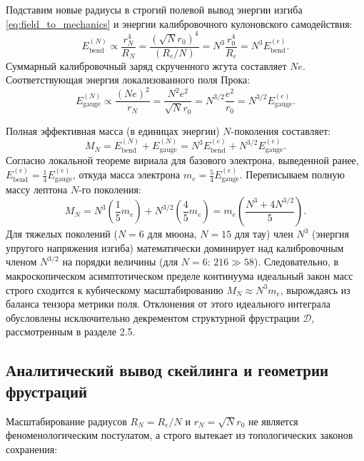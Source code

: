\documentclass[12pt,a4paper]{article}
\begin{document}
Подставим новые радиусы в строгий полевой вывод энергии изгиба \eqref{eq:field_to_mechanics} и энергии калибровочного кулоновского самодействия:
\begin{equation}
E_{\text{bend}}^{(N)} \propto \frac{r_N^4}{R_N} = \frac{(\sqrt{N} r_0)^4}{(R_e / N)} = N^3 \frac{r_0^4}{R_e} = N^3 E_{\text{bend}}^{(e)}.
\end{equation}
Суммарный калибровочный заряд скрученного жгута составляет $N e$. Соответствующая энергия локализованного поля Прока:
\begin{equation}
E_{\text{gauge}}^{(N)} \propto \frac{(Ne)^2}{r_N} = \frac{N^2 e^2}{\sqrt{N} r_0} = N^{3/2} \frac{e^2}{r_0} = N^{3/2} E_{\text{gauge}}^{(e)}.
\end{equation}

Полная эффективная масса (в единицах энергии) $N$-поколения составляет:
\begin{equation}
M_N = E_{\text{bend}}^{(N)} + E_{\text{gauge}}^{(N)} = N^3 E_{\text{bend}}^{(e)} + N^{3/2} E_{\text{gauge}}^{(e)}.
\end{equation}
Согласно локальной теореме вириала для базового электрона, выведенной ранее, $E_{\text{bend}}^{(e)} = \frac{1}{4} E_{\text{gauge}}^{(e)}$, откуда масса электрона $m_e = \frac{5}{4} E_{\text{gauge}}^{(e)}$. 
Переписываем полную массу лептона $N$-го поколения:
\begin{equation}
M_N = N^3 \left( \frac{1}{5} m_e \right) + N^{3/2} \left( \frac{4}{5} m_e \right) = m_e \left( \frac{N^3 + 4 N^{3/2}}{5} \right).
\end{equation}
Для тяжелых поколений ($N=6$ для мюона, $N=15$ для тау) член $N^3$ (энергия упругого напряжения изгиба) математически доминирует над калибровочным членом $N^{3/2}$ на порядки величины (для $N=6$: $216 \gg 58$).
Следовательно, в макроскопическом асимптотическом пределе континуума идеальный закон масс строго сходится к кубическому масштабированию $M_N \approx N^3 m_e$, вырождаясь из баланса тензора метрики поля. Отклонения от этого идеального интеграла обусловлены исключительно декрементом структурной фрустрации $\mathcal{D}$, рассмотренным в разделе 2.5.
	
\subsection{Аналитический вывод скейлинга и геометрии фрустраций}
Масштабирование радиусов $R_N = R_e/N$ и $r_N = \sqrt{N}r_0$ не является феноменологическим постулатом, а строго вытекает из топологических законов сохранения:
\end{document}
